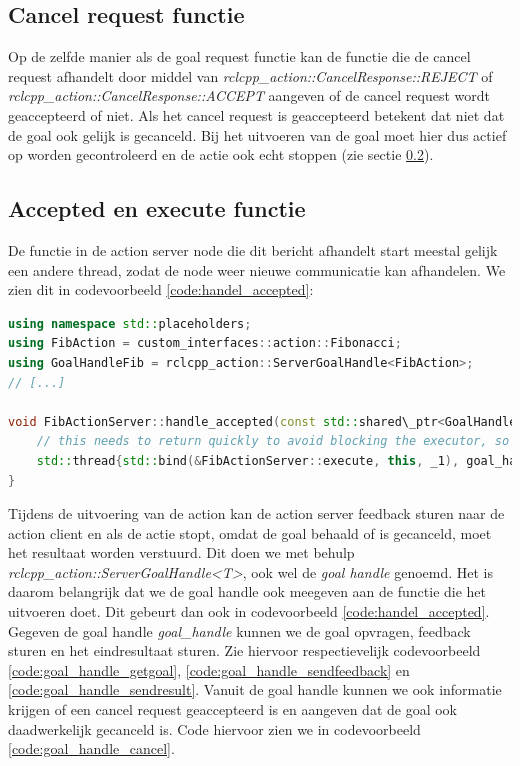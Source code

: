 \subsection{Cancel request functie}
\noindent Op de zelfde manier als de goal request functie kan de functie die de cancel request afhandelt door middel van \textit{rclcpp\_action::CancelResponse::REJECT} of \textit{rclcpp\_action::CancelResponse::ACCEPT} aangeven of de cancel request wordt geaccepteerd of niet. Als het cancel request is geaccepteerd betekent dat niet dat de goal ook gelijk is gecanceld. Bij het uitvoeren van de goal moet hier dus actief op worden gecontroleerd en de actie ook echt stoppen (zie sectie \ref{sec:accept_functie}). 

\subsection{Accepted en execute functie}
\label{sec:accept_functie}
De functie in de action server node die dit bericht afhandelt start meestal gelijk een andere thread, zodat de node weer nieuwe communicatie kan afhandelen. We zien dit in codevoorbeeld \ref{code:handel_accepted}:

\begin{lstlisting}[language=C++, caption={\textit{handle\_accepted()} start functie execute() in een thread. Hierin wordt de actie uitgevoerd.}, firstnumber=0, label={code:handel_accepted}]
using namespace std::placeholders;
using FibAction = custom_interfaces::action::Fibonacci;
using GoalHandleFib = rclcpp_action::ServerGoalHandle<FibAction>;
// [...]

void FibActionServer::handle_accepted(const std::shared\_ptr<GoalHandleFib> goal\_handle){
    // this needs to return quickly to avoid blocking the executor, so spin up a new thread
    std::thread{std::bind(&FibActionServer::execute, this, _1), goal_handle}.detach();
}
\end{lstlisting}

Tijdens de uitvoering van de action kan de action server feedback sturen naar de action client en als de actie stopt, omdat de goal behaald of is gecanceld, moet het resultaat worden verstuurd. Dit doen we met behulp \textit{rclcpp\_action::ServerGoalHandle<T>}, ook wel de \textit{goal handle} genoemd. Het is daarom belangrijk dat we de goal handle ook meegeven aan de functie die het uitvoeren doet. Dit gebeurt dan ook in codevoorbeeld \ref{code:handel_accepted}. Gegeven de goal handle \textit{goal\_handle} kunnen we de goal opvragen, feedback sturen en het eindresultaat sturen. Zie hiervoor respectievelijk codevoorbeeld \ref{code:goal_handle_getgoal}, \ref{code:goal_handle_sendfeedback} en \ref{code:goal_handle_sendresult}. Vanuit de goal handle kunnen we ook informatie krijgen of een cancel request geaccepteerd is en aangeven dat de goal ook daadwerkelijk gecanceld is. Code hiervoor zien we in codevoorbeeld \ref{code:goal_handle_cancel}.

